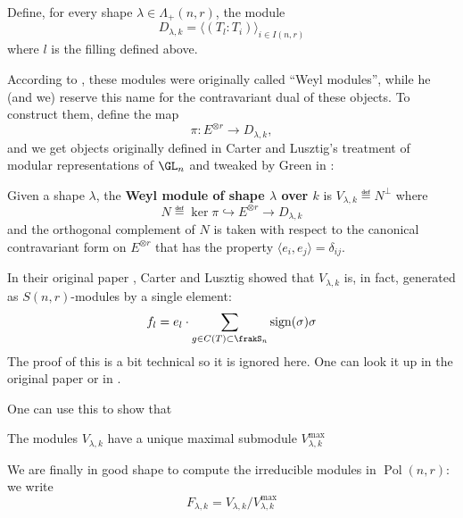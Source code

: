 \documentclass[12pt]{article}
\DeclareMathOperator{\Pol}{Pol}
\begin{document}
		\begin{defn}
			Define, for every shape $\lambda\in\Lambda_+(n,r)$, the module
			\[D_{\lambda,k}=\langle(T_l:T_i)\rangle_{i\in I(n,r)}\]
			where $l$ is the filling defined above.
		\end{defn}
		According to \cite{green}, these modules were originally called ``Weyl modules'', while he (and we)
		reserve this name for the contravariant dual of these objects. To construct them, define the map 
		\begin{equation}\label{eqn:pimap}
			\pi:E^{\otimes r}\to D_{\lambda, k},
		\end{equation}
		and we get objects originally defined in Carter and Lusztig's treatment of modular representations of $\GL_n$ \cite{carter-lusztig}
		and tweaked by Green in \cite{green}:
		\begin{defn}
			Given a shape $\lambda$, the \textbf{Weyl module of shape $\lambda$ over $k$} is 
			$V_{\lambda, k}\eqdef N^\perp$ where 
			\[N\eqdef\ker\pi\hookrightarrow E^{\otimes r}\to D_{\lambda,k}\]
			and the orthogonal complement of $N$ is taken with respect to the canonical contravariant form on $E^{\otimes r}$ that has the property $\langle e_i,e_j\rangle=\delta_{ij}$.
		\end{defn}

		In their original paper \cite[p.218]{carter-lusztig}, Carter and Lusztig showed that $V_{\lambda,k}$ is, in fact, generated as $S(n,r)$-modules by a single element:
		\[f_l=e_l\cdot\sum_{g\in C(T)\subset\frakS_n}\operatorname{sign}(\sigma)\sigma\]
		The proof of this is a bit technical so it is ignored here. One can look it up in the original paper or in \cite[46]{green}.
		
		One can use this to show that 
		\begin{lem}
			The modules $V_{\lambda,k}$ have a unique maximal submodule $V_{\lambda,k}^{\text{max}}$
		\end{lem}

		We are finally in good shape to compute the irreducible modules in $\Pol(n,r)$: we write
		\[F_{\lambda, k}=V_{\lambda,k}/V_{\lambda,k}^\text{max}\]
\end{document}
